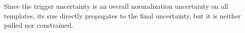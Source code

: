 

Since the trigger uncertainty is an overall normalization uncertainty on all templates, its size directly propagates to the final uncertainty, but it is neither pulled nor constrained.  







